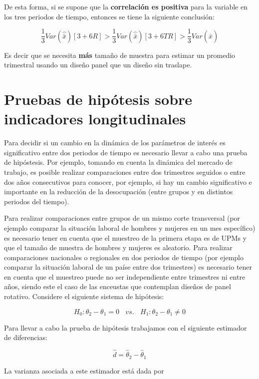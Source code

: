 \documentclass[
  12pt,
  spanish,
]{book}
\begin{document}
De esta forma, si se supone que la \textbf{correlación es positiva} para la variable en los tres periodos de tiempo, entonces se tiene la siguiente conclusión:

\[
\frac{1}{3} Var(\hat{\bar{x}}) [3+6R] > \frac{1}{3} Var(\hat{\bar{x}}) [3+6TR] > \frac{1}{3} Var(\hat{\bar{x}})
\]

Es decir que se necesita \textbf{más} tamaño de muestra para estimar un promedio trimestral usando un diseño panel que un diseño sin traslape.

\hypertarget{pruebas-de-hipuxf3tesis-sobre-indicadores-longitudinales}{%
\section{Pruebas de hipótesis sobre indicadores longitudinales}\label{pruebas-de-hipuxf3tesis-sobre-indicadores-longitudinales}}

Para decidir si un cambio en la dinámica de los parámetros de interés es significativo entre dos periodos de tiempo es necesario llevar a cabo una prueba de hipóstesis. Por ejemplo, tomando en cuenta la dinámica del mercado de trabajo, es posible realizar comparaciones entre dos trimestres seguidos o entre dos años consecutivos para conocer, por ejemplo, si hay un cambio significativo e importante en la reducción de la desocupación (entre grupos y en distintos periodos del tiempo).

Para realizar comparaciones entre grupos de un mismo corte transversal (por ejemplo comparar la situación laboral de hombres y mujeres en un mes específico) es necesario tener en cuenta que el muestreo de la primera etapa es de UPMs y que el tamaño de muestra de hombres y mujeres es aleatorio. Para realizar comparaciones nacionales o regionales en dos periodos de tiempo (por ejemplo comparar la situación laboral de un paíse entre dos trimestres) es necesario tener en cuenta que el muestreo puede no ser independiente entre trimestres ni entre años, siendo este el caso de las enceustas que contemplan diseños de panel rotativo. Considere el siguiente sistema de hipótesis:

\[
H_0: \theta_2 - \theta_1 = 0 \ \ \ \ vs. \ \ \ \ H_1: \theta_2 - \theta_1 \neq 0
\]

Para llevar a cabo la prueba de hipótesis trabajamos con el siguiente estimador de diferencias:

\[
\hat{d} = \hat{\theta}_2 - \hat{\theta}_1
\]

La varianza asociada a este estimador está dada por
\end{document}
